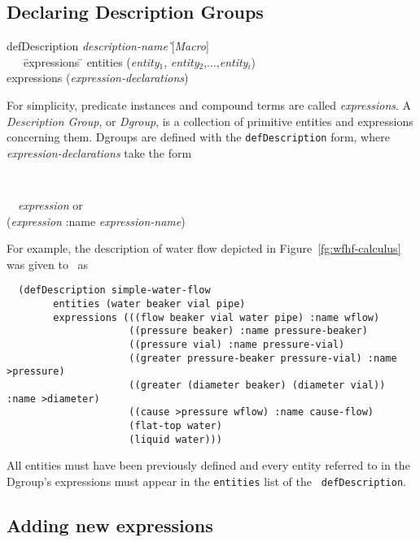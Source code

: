 \subsection{Declaring Description Groups}\label{ss:new-dgroups}

\begin{tt}
\begin{tabbing}
defDescription {\it description-name}  \` [{\it Macro}]   \\
\ \ \ \= expressions \= \kill
      \> entities  \> ({\it entity$_{1}$}, {\it entity$_{2}$},$\ldots$,{\it entity$_{i}$}) \\ 
      \> expressions \> ({\it expression-declarations})
\end{tabbing}
\end{tt}

For simplicity, predicate instances and compound terms are called {\it
expressions}. A {\em Description Group}, or {\em Dgroup}, is a
collection of primitive entities and expressions concerning them.  Dgroups
are defined with the {\tt defDescription} form,
where {\it expression-declarations} take the form {\tt
\begin{tabbing}
\ \   \= {\it expression} {\rm or} \\
      \> ({\it expression} :name {\it expression-name})
\end{tabbing}
}
\noindent
For example, the description of water flow depicted in
Figure~\ref{fg:wfhf-calculus} was given to \SME\ as
\begin{verbatim}
  (defDescription simple-water-flow
        entities (water beaker vial pipe)
        expressions (((flow beaker vial water pipe) :name wflow)
                     ((pressure beaker) :name pressure-beaker)
                     ((pressure vial) :name pressure-vial)
                     ((greater pressure-beaker pressure-vial) :name >pressure)
                     ((greater (diameter beaker) (diameter vial)) :name >diameter)
                     ((cause >pressure wflow) :name cause-flow)
                     (flat-top water)
                     (liquid water)))
\end{verbatim}
All entities must have been previously defined and every entity referred to
in the Dgroup's expressions must appear in the {\tt entities} list of the {\tt
defDescription}.

\subsection{Adding new expressions}\label{ss:new-expressions}

